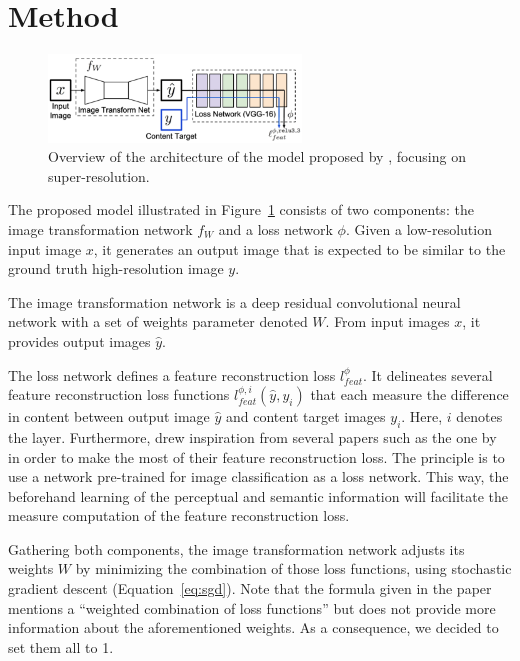 \documentclass{article}
\begin{document}
{
    \section{Method}
    \label{sec:method}

    \begin{figure}[ht]
        \centering
        \includegraphics[width=0.6\textwidth]{images/model.png}
        \caption{Overview of the architecture of the model proposed by \cite{sr}, focusing on super-resolution.}
        \label{fig:model}
    \end{figure}

    The proposed model illustrated in Figure~\ref{fig:model} consists of two components: the image transformation network $f_W$ and a loss network $\phi$. Given a low-resolution input image $x$, it generates an output image that is expected to be similar to the ground truth high-resolution image $y$.

    The image transformation network is a deep residual convolutional neural network with a set of weights parameter denoted $W$. From input images $x$, it provides output images $\hat y$.

    The loss network defines a feature reconstruction loss $l^\phi_{feat}$. It delineates several feature reconstruction loss functions $l^{\phi, i}_{feat}(\hat y, y_i)$ that each measure the difference in content between output image $\hat y$ and content target images $y_i$. Here, $i$ denotes the layer. Furthermore, \cite{sr} drew inspiration from several papers such as the one by \cite{gatys} in order to make the most of their feature reconstruction loss. The principle is to use a network pre-trained for image classification as a loss network. This way, the beforehand learning of the perceptual and semantic information will facilitate the measure computation of the feature reconstruction loss.

    \bigskip

    Gathering both components, the image transformation network adjusts its weights $W$ by minimizing the combination of those loss functions, using stochastic gradient descent (Equation~\ref{eq:sgd}). Note that the formula given in the paper \citep{sr} mentions a “weighted combination of loss functions” but does not provide more information about the aforementioned weights. As a consequence, we decided to set them all to 1.

}
\end{document}
